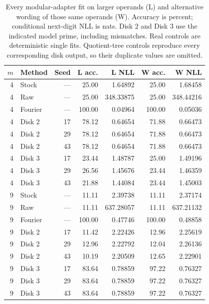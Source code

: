 \begin{table}[htbp]
\centering\small
\caption{Every modular-adapter fit on larger operands (L) and alternative
wording of those same operands (W). Accuracy is percent; conditional next-digit
NLL is nats. Disk 2 and Disk 3 use the indicated model prime, including mismatches.
Real controls are deterministic single fits. Quotient-tree controls reproduce
every corresponding disk output, so their duplicate values are omitted.}
\label{tab:modular-primary}
\begin{tabular}{rlrrrrr}
\toprule
$m$ & Method & Seed & L acc. & L NLL & W acc. & W NLL\\
\midrule
4 & Stock & --- & 25.00 & 1.64892 & 25.00 & 1.68458\\
4 & Raw & --- & 25.00 & 348.33875 & 25.00 & 348.44216\\
4 & Fourier & --- & 100.00 & 0.04964 & 100.00 & 0.05036\\
4 & Disk 2 & 17 & 78.12 & 0.64654 & 71.88 & 0.66473\\
4 & Disk 2 & 29 & 78.12 & 0.64654 & 71.88 & 0.66473\\
4 & Disk 2 & 43 & 78.12 & 0.64654 & 71.88 & 0.66473\\
4 & Disk 3 & 17 & 23.44 & 1.48787 & 25.00 & 1.49196\\
4 & Disk 3 & 29 & 26.56 & 1.45676 & 23.44 & 1.46359\\
4 & Disk 3 & 43 & 21.88 & 1.44084 & 23.44 & 1.45003\\
9 & Stock & --- & 11.11 & 2.39738 & 11.11 & 2.37174\\
9 & Raw & --- & 11.11 & 637.28057 & 11.11 & 637.21132\\
9 & Fourier & --- & 100.00 & 0.47746 & 100.00 & 0.48858\\
9 & Disk 2 & 17 & 11.42 & 2.22426 & 12.96 & 2.25619\\
9 & Disk 2 & 29 & 12.96 & 2.22792 & 12.04 & 2.26136\\
9 & Disk 2 & 43 & 10.19 & 2.20509 & 12.65 & 2.22901\\
9 & Disk 3 & 17 & 83.64 & 0.78859 & 97.22 & 0.76327\\
9 & Disk 3 & 29 & 83.64 & 0.78859 & 97.22 & 0.76327\\
9 & Disk 3 & 43 & 83.64 & 0.78859 & 97.22 & 0.76327\\
\bottomrule
\end{tabular}
\end{table}

